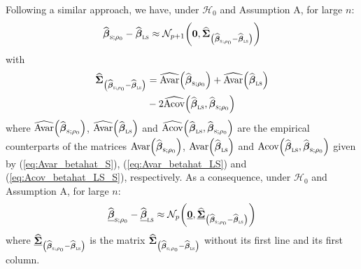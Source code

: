 Following a similar approach, we have, under $\mathcal{H}_{0}$ and Assumption
A, for large $n$:
\[
\sthat{\boldsymbol\beta}_{\stsc{S};\rho_{0}}-\sthat{\boldsymbol{\beta
}}_{\stsc{LS}}\approx\mathcal{N}_{p+1}\left(  \stvec{0},\widehat
{\boldsymbol{\Sigma}}_{\left(  \sthat{\boldsymbol\beta}_{\stsc{S}%
;\rho_{0}}-\sthat{\boldsymbol\beta}_{\stsc{LS}}\right)  }\right)
\]
with
\begin{align}
\sthat{\boldsymbol{\Sigma}}_{\left(  \sthat{\boldsymbol\beta%
}_{\stsc{S};\rho_{0}}-\sthat{\boldsymbol\beta}_{\stsc{LS}}\right)  }
&  =\sthat{\mathrm{Avar}}\left(  \sthat{\boldsymbol\beta}_{\stsc{S}%
;\rho_{0}}\right)  +\sthat{\mathrm{Avar}}\left(  \sthat{\boldsymbol{\beta
}}_{\stsc{LS}}\right) \label{eq:Hausman_sigmahat_S-LS}\\
&  -2\sthat{\mathrm{Acov}}\left(  \sthat{\boldsymbol\beta}_{\stsc{LS}%
},\sthat{\boldsymbol\beta}_{\stsc{S};\rho_{0}}\right) \nonumber
\end{align}
where $\sthat{\mathrm{Avar}}\left(  \sthat{\boldsymbol\beta}%
_{\stsc{S};\rho_{0}}\right)  $, $\sthat{\mathrm{Avar}}\left(
\sthat{\boldsymbol\beta}_{\stsc{LS}}\right)  $ and $\widehat
{\mathrm{Acov}}\left(  \sthat{\boldsymbol\beta}_{\stsc{LS}}%
,\sthat{\boldsymbol\beta}_{\stsc{S};\rho_{0}}\right)  $ are the
empirical counterparts of the matrices $\mathrm{Avar}\left(  \widehat
{\boldsymbol\beta}_{\stsc{S};\rho_{0}}\right)  $, $\mathrm{Avar}\left(
\sthat{\boldsymbol\beta}_{\stsc{LS}}\right)  $ and $\mathrm{Acov}\left(
\sthat{\boldsymbol\beta}_{\stsc{LS}},\sthat{\boldsymbol\beta%
}_{\stsc{S};\rho_{0}}\right)  $ given by (\ref{eq:Avar_betahat_S}),
(\ref{eq:Avar_betahat_LS}) and (\ref{eq:Acov_betahat_LS_S}), respectively. As
a consequence, under $\mathcal{H}_{0}$ and Assumption A, for large $n$:
\begin{equation}
\sthat{\underline{\boldsymbol\beta}}_{\stsc{S};\rho_{0}}-\underline
{\sthat{\boldsymbol\beta}}_{\stsc{LS}}\approx\mathcal{N}_{p}\left(
\underline{\stvec{0}},\sthat{\underline{\boldsymbol{\Sigma}}}_{\left(
\sthat{\boldsymbol\beta}_{\stsc{S};\rho_{0}}-\sthat{\boldsymbol{\beta
}}_{\stsc{LS}}\right)  }\right)  \label{eq:Hausman_normality_S-LS}%
\end{equation}
where $\sthat{\underline{\boldsymbol{\Sigma}}}_{\left(  \widehat
{\boldsymbol\beta}_{\stsc{S};\rho_{0}}-\sthat{\boldsymbol\beta%
}_{\stsc{LS}}\right)  }$ is the matrix $\sthat{\boldsymbol{\Sigma}%
}_{\left(  \sthat{\boldsymbol\beta}_{\stsc{S};\rho_{0}}-\widehat
{\boldsymbol\beta}_{\stsc{LS}}\right)  }$ without its first line and its
first column.

